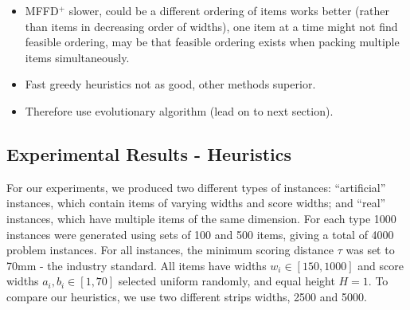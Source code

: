 \documentclass{elsarticle}
\begin{document}
{\begin{itemize}[leftmargin=*]
	\item MFFD$^+$ slower, could be a different ordering of items works better (rather than items in decreasing order of widths), one item at a time might not find feasible ordering, may be that feasible ordering exists when packing multiple items simultaneously.
	\item Fast greedy heuristics not as good, other methods superior.
	\item Therefore use evolutionary algorithm (lead on to next section).
\end{itemize}
}


\subsection{Experimental Results - Heuristics}
\label{sub:expheuristics}
For our experiments, we produced two different types of instances: ``artificial'' instances, which contain items of varying widths and score widths; and ``real'' instances, which have multiple items of the same dimension. For each type 1000 instances were generated using sets of 100 and 500 items, giving a total of 4000 problem instances. For all instances, the minimum scoring distance $\tau$ was set to 70mm - the industry standard. All items have widths $w_i \in [150,1000]$ and score widths $a_i, b_i \in [1,70]$ selected uniform randomly, and equal height $H=1$. To compare our heuristics, we use two different strips widths, 2500 and 5000.
\end{document}
